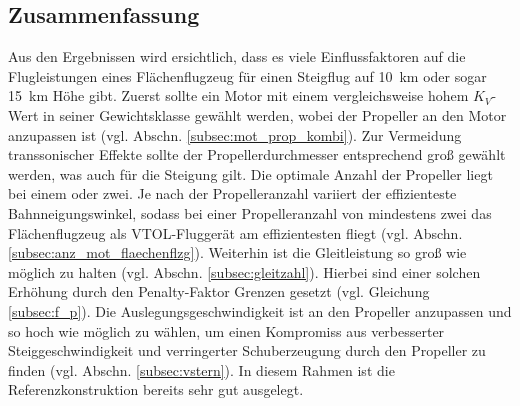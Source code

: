 \subsection{Zusammenfassung}
Aus den Ergebnissen wird ersichtlich, dass es viele Einflussfaktoren auf die Flugleistungen eines Flächenflugzeug für einen Steigflug auf \SI{10}{km} oder sogar \SI{15}{km} Höhe gibt. Zuerst sollte ein Motor mit einem vergleichsweise hohem \ensuremath{K_V}-Wert in seiner Gewichtsklasse gewählt werden, wobei der Propeller an den Motor anzupassen ist (vgl. Abschn. \ref{subsec:mot_prop_kombi}). Zur Vermeidung transsonischer Effekte sollte der Propellerdurchmesser entsprechend groß gewählt werden, was auch für die Steigung gilt. Die optimale Anzahl der Propeller liegt bei einem oder zwei. Je nach der Propelleranzahl variiert der effizienteste Bahnneigungswinkel, sodass bei einer Propelleranzahl von mindestens zwei das Flächenflugzeug als VTOL-Fluggerät am effizientesten fliegt (vgl. Abschn. \ref{subsec:anz_mot_flaechenflzg}). Weiterhin ist die Gleitleistung so groß wie möglich zu halten (vgl. Abschn. \ref{subsec:gleitzahl}). Hierbei sind einer solchen Erhöhung durch den Penalty-Faktor Grenzen gesetzt (vgl. Gleichung \ref{subsec:f_p}). Die Auslegungsgeschwindigkeit ist an den Propeller anzupassen und so hoch wie möglich zu wählen, um einen Kompromiss aus verbesserter Steiggeschwindigkeit und verringerter Schuberzeugung durch den Propeller zu finden (vgl. Abschn. \ref{subsec:vstern}). In diesem Rahmen ist die Referenzkonstruktion bereits sehr gut ausgelegt.\\


